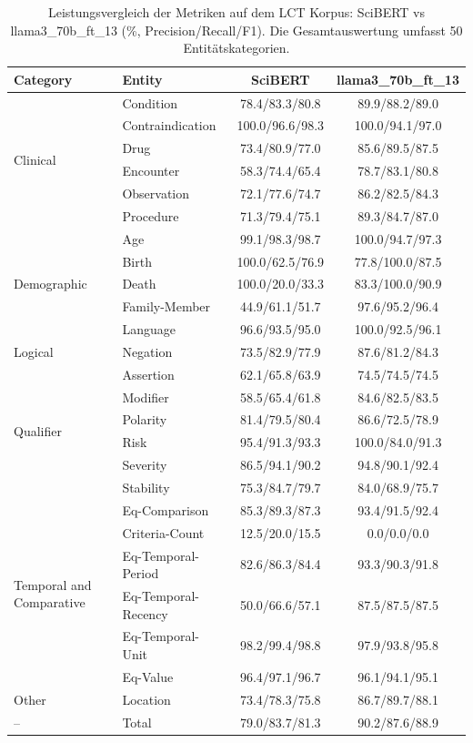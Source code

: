 
\begin{table}[htbp]
\centering
\begin{tabular}{llcc}
\toprule
\textbf{Category} & \textbf{Entity} & \textbf{SciBERT} & \textbf{llama3_70b_ft_13} \\
\midrule
\multirow{6}{*}{Clinical} & Condition & 78.4/83.3/80.8 & 89.9/88.2/89.0 \\
 & Contraindication & 100.0/96.6/98.3 & 100.0/94.1/97.0 \\
 & Drug & 73.4/80.9/77.0 & 85.6/89.5/87.5 \\
 & Encounter & 58.3/74.4/65.4 & 78.7/83.1/80.8 \\
 & Observation & 72.1/77.6/74.7 & 86.2/82.5/84.3 \\
 & Procedure & 71.3/79.4/75.1 & 89.3/84.7/87.0 \\
\midrule
\multirow{5}{*}{Demographic} & Age & 99.1/98.3/98.7 & 100.0/94.7/97.3 \\
 & Birth & 100.0/62.5/76.9 & 77.8/100.0/87.5 \\
 & Death & 100.0/20.0/33.3 & 83.3/100.0/90.9 \\
 & Family-Member & 44.9/61.1/51.7 & 97.6/95.2/96.4 \\
 & Language & 96.6/93.5/95.0 & 100.0/92.5/96.1 \\
\midrule
Logical & Negation & 73.5/82.9/77.9 & 87.6/81.2/84.3 \\
\midrule
\multirow{6}{*}{Qualifier} & Assertion & 62.1/65.8/63.9 & 74.5/74.5/74.5 \\
 & Modifier & 58.5/65.4/61.8 & 84.6/82.5/83.5 \\
 & Polarity & 81.4/79.5/80.4 & 86.6/72.5/78.9 \\
 & Risk & 95.4/91.3/93.3 & 100.0/84.0/91.3 \\
 & Severity & 86.5/94.1/90.2 & 94.8/90.1/92.4 \\
 & Stability & 75.3/84.7/79.7 & 84.0/68.9/75.7 \\
\midrule
\multirow{6}{*}{Temporal and Comparative} & Eq-Comparison & 85.3/89.3/87.3 & 93.4/91.5/92.4 \\
 & Criteria-Count & 12.5/20.0/15.5 & 0.0/0.0/0.0 \\
 & Eq-Temporal-Period & 82.6/86.3/84.4 & 93.3/90.3/91.8 \\
 & Eq-Temporal-Recency & 50.0/66.6/57.1 & 87.5/87.5/87.5 \\
 & Eq-Temporal-Unit & 98.2/99.4/98.8 & 97.9/93.8/95.8 \\
 & Eq-Value & 96.4/97.1/96.7 & 96.1/94.1/95.1 \\
\midrule
Other & Location & 73.4/78.3/75.8 & 86.7/89.7/88.1 \\
\midrule
-- & Total & 79.0/83.7/81.3 & 90.2/87.6/88.9 \\
\bottomrule
\end{tabular}
\caption{Leistungsvergleich der Metriken auf dem LCT Korpus: SciBERT vs llama3_70b_ft_13 (\%, Precision/Recall/F1). Die Gesamtauswertung umfasst 50 Entitätskategorien.}
\label{tab:metrics_comparison}
\end{table}
    